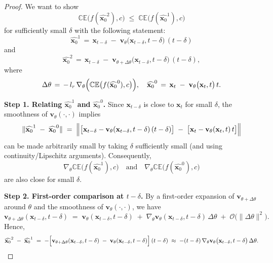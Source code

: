 \begin{proof}
We want to show 
\[
\mathbb{CE}\bigl(f(\widehat{\mathbf{x}_0}^2), c\bigr)\; \le\; \mathbb{CE}\bigl(f(\widehat{\mathbf{x}_0}^1), c\bigr)
\]
for sufficiently small $\delta$ with the following statement:
\[
\widehat{\mathbf{x}_{0}}^1 
\,=\, \mathbf{x}_{t-\delta} \;-\; \mathbf{v}_\theta\bigl(\mathbf{x}_{t-\delta}, t-\delta\bigr)\,(t-\delta)
\]
and
\[
\widehat{\mathbf{x}_{0}}^2 
\,=\, \mathbf{x}_{t-\delta} \;-\; \mathbf{v}_{\theta+\Delta \theta}\bigl(\mathbf{x}_{t-\delta}, t-\delta\bigr)\,(t-\delta),
\]
where 
\[
\Delta \theta 
\,=\, -\,l_r \,\nabla_\theta\Bigl(\mathbb{CE}\bigl(f(\widehat{\mathbf{x}_0}^0), c\bigr)\Bigr), 
\quad
\widehat{\mathbf{x}_0}^0 
\,=\, \mathbf{x}_t \;-\; \mathbf{v}_\theta\bigl(\mathbf{x}_t, t\bigr)\,t.
\]

\noindent
\textbf{Step 1. Relating \(\widehat{\mathbf{x}_0}^1\) and \(\widehat{\mathbf{x}_0}^0\).}
Since \(\mathbf{x}_{t-\delta}\) is close to \(\mathbf{x}_t\) for small \(\delta\), the smoothness of \(\mathbf{v}_\theta(\cdot,\cdot)\) implies
\[
\|\widehat{\mathbf{x}_0}^1 \;-\; \widehat{\mathbf{x}_0}^0\| \;=\; 
\Bigl\|\bigl[\mathbf{x}_{t-\delta} - \mathbf{v}_\theta(\mathbf{x}_{t-\delta}, t-\delta)\,(t-\delta)\bigr]
\;-\;
\bigl[\mathbf{x}_t - \mathbf{v}_\theta(\mathbf{x}_t, t)\,t\bigr]\Bigr\|
\]
can be made arbitrarily small by taking \(\delta\) sufficiently small (and using continuity/Lipschitz arguments). Consequently, 
\[
\nabla_\theta \mathbb{CE}\bigl(f(\widehat{\mathbf{x}_0}^1), c\bigr)
\quad\text{and}\quad
\nabla_\theta \mathbb{CE}\bigl(f(\widehat{\mathbf{x}_0}^0), c\bigr)
\]
are also close for small \(\delta\).

\medskip
\noindent
\textbf{Step 2. First-order comparison at \(t-\delta\).}
By a first-order expansion of \(\mathbf{v}_{\theta+\Delta\theta}\) around \(\theta\) and the smoothness of \(\mathbf{v}_\theta(\cdot,\cdot)\), we have
\[
\mathbf{v}_{\theta+\Delta \theta}(\mathbf{x}_{t-\delta}, t-\delta)
\;=\;
\mathbf{v}_{\theta}(\mathbf{x}_{t-\delta}, t-\delta)
\;+\;
\nabla_\theta \mathbf{v}_{\theta}(\mathbf{x}_{t-\delta}, t-\delta)\,\Delta\theta
\;+\;\mathcal{O}\bigl(\|\Delta\theta\|^2\bigr).
\]
Hence,
\[
\widehat{\mathbf{x}_{0}}^2
\;-\;\widehat{\mathbf{x}_{0}}^1
\;=\;
-\Bigl[\mathbf{v}_{\theta+\Delta \theta}(\mathbf{x}_{t-\delta}, t-\delta) \;-\; \mathbf{v}_\theta(\mathbf{x}_{t-\delta}, t-\delta)\Bigr]\,(t-\delta)
\;\approx\;
-(t-\delta)\,\nabla_\theta \mathbf{v}_{\theta}\bigl(\mathbf{x}_{t-\delta}, t-\delta\bigr)\,\Delta\theta.
\]


\end{proof}
